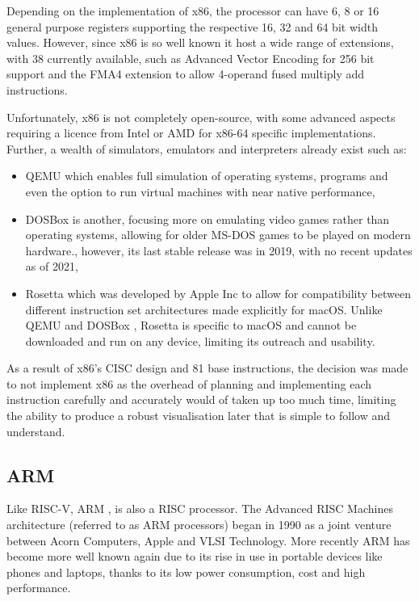 Depending on the implementation of x86, the processor can have 6, 8 or 16 general purpose registers supporting the respective 16, 32 and 64 bit width values. However, since x86 \cite{intelcorporation_2023_intel} is so well known it host a wide range of extensions, with 38 currently available, such as Advanced Vector Encoding for 256 bit support and the FMA4 extension to allow 4-operand fused multiply add instructions.

Unfortunately, x86 is not completely open-source, with some advanced aspects requiring a licence from Intel or AMD for x86-64 specific implementations. Further, a wealth of simulators, emulators and interpreters already exist such as:
\begin{itemize}
    \item QEMU \cite{bellard_2023_qemu} which enables full simulation of operating systems, programs and even the option to run virtual machines with near native performance,
    \item DOSBox \cite{dosbox_2021_dosbox} is another, focusing more on emulating video games rather than operating systems, allowing for older MS-DOS games to be played on modern hardware., however, its last stable release was in 2019, with no recent updates as of 2021,
    \item Rosetta \cite{appleinc_2023_about} which was developed by Apple Inc to allow for compatibility between different instruction set architectures made explicitly for macOS. Unlike QEMU \cite{bellard_2023_qemu} and DOSBox \cite{dosbox_2021_dosbox}, Rosetta is specific to macOS and cannot be downloaded and run on any device, limiting its outreach and usability.
\end{itemize}



As a result of x86's CISC design and 81 base instructions, the decision was made to not implement x86 as the overhead of planning and implementing each instruction carefully and accurately would of taken up too much time, limiting the ability to produce a robust visualisation later that is simple to follow and understand.
\subsection{ARM}
Like RISC-V, ARM \cite{armltd_2023_defining}, is also a \ac{RISC} processor. The Advanced RISC Machines architecture (referred to as ARM processors) began in 1990 as a joint venture between Acorn Computers, Apple and VLSI Technology. More recently ARM has become more well known again due to its rise in use in portable devices like phones and laptops, thanks to its low power consumption, cost and high performance. \cite{schmitt_2021_is}

